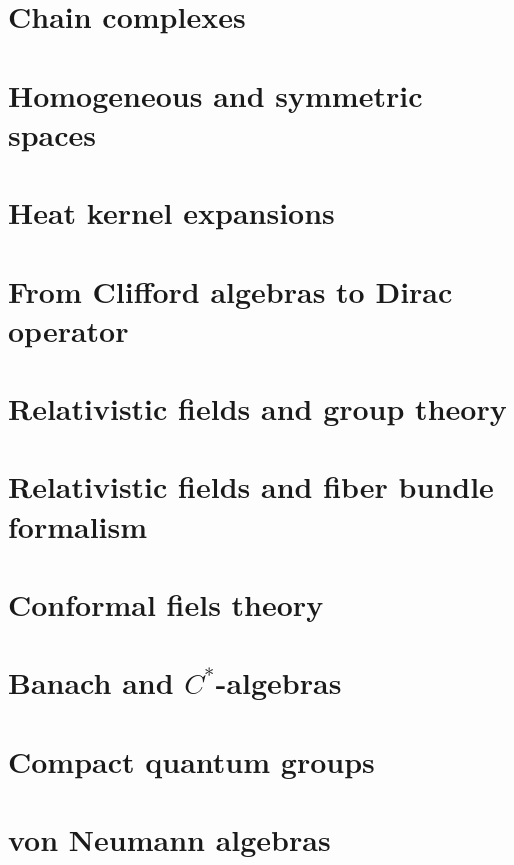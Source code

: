 \chapter{Chain complexes}


\chapter{Homogeneous and symmetric spaces}




\chapter{Heat kernel expansions}


\chapter{From Clifford algebras to Dirac operator}



\chapter{Relativistic fields and group theory}


\chapter{Relativistic fields and fiber bundle formalism}


\chapter{Conformal fiels theory}


\chapter{Banach and \texorpdfstring{$C^*$}{C*}-algebras}
   
   
   

\chapter{Compact quantum groups}


\chapter{von Neumann algebras}





